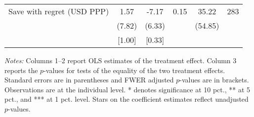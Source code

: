 \begin{table}[h]
{\begin{threeparttable}
\begin{tabular}{l*{5}{c}}
Save with regret (USD PPP)&     1.57&    -7.17&     0.15&    35.22&      283\\
          &   (7.82)&   (6.33)&         &  (54.85)&         \\
          &   [1.00]&   [0.33]&         &         &         \\
\bottomrule \end{tabular} \begin{tablenotes}[flushleft] \footnotesize \item \emph{Notes:} Columns 1--2 report OLS estimates of the treatment effect. Column 3 reports the \(p\)-values for tests of the equality of the two treatment effects. Standard errors are in parentheses and FWER adjusted \(p\)-values are in brackets. Observations are at the individual level. * denotes significance at 10 pct., ** at 5 pct., and *** at 1 pct. level. Stars on the coefficient estimates reflect unadjusted \(p\)-values. \end{tablenotes} \end{threeparttable} } \end{table}

